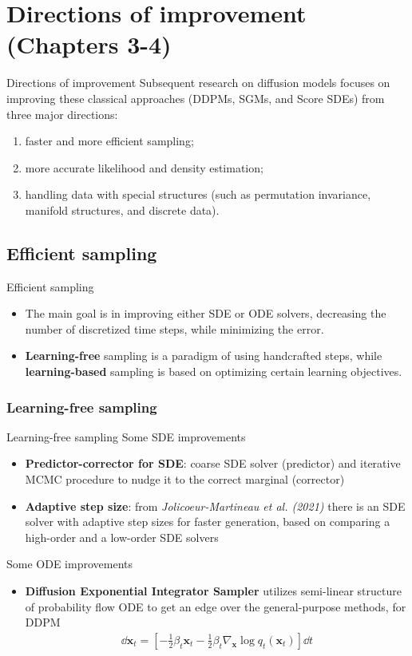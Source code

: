 \documentclass{beamer}
\begin{document}
\section{Directions of improvement (Chapters 3-4)}
\begin{frame}{Directions of improvement}
Subsequent research on diffusion models focuses on improving these classical approaches
(DDPMs, SGMs, and Score SDEs) from three major directions:
\begin{enumerate}
  \item faster and more efficient sampling;
  \item more accurate likelihood and density estimation;
  \item handling data with special structures (such
  as permutation invariance, manifold structures, and discrete data).
\end{enumerate}
\end{frame}

\subsection{Efficient sampling}
\begin{frame}{Efficient sampling}
\begin{itemize}
  \item The main goal is in improving either SDE or ODE solvers, decreasing the number of discretized time steps, while minimizing the error.
  \item \textbf{Learning-free} sampling is a paradigm of using handcrafted steps, while \textbf{learning-based} sampling is based on optimizing certain learning objectives.
\end{itemize}
\end{frame}

\subsubsection{Learning-free sampling}
\begin{frame}{Learning-free sampling}
Some SDE improvements
\begin{itemize}
  \item \textbf{Predictor-corrector for SDE}: coarse SDE solver (predictor) and iterative MCMC procedure to nudge it to the correct marginal (corrector) 
  \item \textbf{Adaptive step size}: from \textit{Jolicoeur-Martineau et al. (2021)} there is an SDE solver with adaptive step sizes for faster generation, based on comparing a high-order and a low-order SDE solvers
\end{itemize}
Some ODE improvements
\begin{itemize}
  \item \textbf{Diffusion Exponential Integrator Sampler} utilizes semi-linear structure of probability flow ODE to get an edge over  the general-purpose methods, for DDPM 
  \begin{align}
    \dd \mathbf{x}_t = \left[-\frac{1}{2}\beta_t \mathbf{x}_t - \frac{1}{2}\beta_t \nabla_{\mathbf{x}}\log q_t (\mathbf{x}_t)\right] \dd t
  \end{align}
\end{itemize}
\end{frame}
\end{document}
